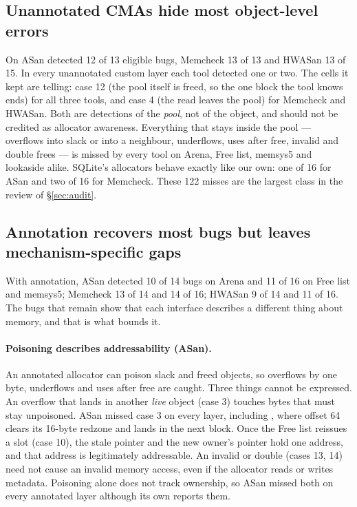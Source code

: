 \begin{table}[!htb]
\centering\footnotesize
\setlength{\tabcolsep}{3.4pt}
\renewcommand{\arraystretch}{1.08}

\caption{Detection matrix for SQLite's allocators and the two rewrites (lab server).}
\label{tab:matrix-sqlite}
\end{table}

\subsection{Unannotated CMAs hide most object-level errors}
\label{sec:q1-blind}

On  ASan detected 12 of 13 eligible bugs, Memcheck 13 of 13 and HWASan 13 of 15. In every unannotated custom layer each tool detected one or two. The cells it kept are telling: case 12 (the pool itself is freed, so the one block the tool knows ends) for all three tools, and case 4 (the read leaves the pool) for Memcheck and HWASan. Both are detections of the \emph{pool}, not of the object, and should not be credited as allocator awareness. Everything that stays inside the pool --- overflows into slack or into a neighbour, underflows, uses after free, invalid and double frees --- is missed by every tool on Arena, Free list, memsys5 and lookaside alike. SQLite's allocators behave exactly like our own: one of 16 for ASan and two of 16 for Memcheck. These 122 misses are the largest class in the review of \S\ref{sec:audit}.

\subsection{Annotation recovers most bugs but leaves mechanism-specific gaps}
\label{sec:q1-annot}

With annotation, ASan detected 10 of 14 bugs on Arena and 11 of 16 on Free list and memsys5; Memcheck 13 of 14 and 14 of 16; HWASan 9 of 14 and 11 of 16. The bugs that remain show that each interface describes a different thing about memory, and that is what bounds it.

\paragraph{Poisoning describes addressability (ASan).} An annotated allocator can poison slack and freed objects, so overflows by one byte, underflows and uses after free are caught. Three things cannot be expressed. An overflow that lands in another \emph{live} object (case 3) touches bytes that must stay unpoisoned. ASan missed case 3 on every layer, including , where offset 64 clears its 16-byte redzone and lands in the next block. Once the Free list reissues a slot (case 10), the stale pointer and the new owner's pointer hold one address, and that address is legitimately addressable. An invalid or double  (cases 13, 14) need not cause an invalid memory access, even if the allocator reads or writes metadata. Poisoning alone does not track ownership, so ASan missed both on every annotated layer although its own  reports them.

